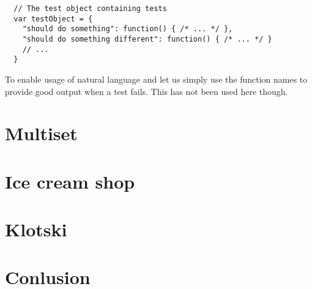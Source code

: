 \documentclass[a4paper,10pt]{article}
\begin{document}
\begin{verbatim}
  // The test object containing tests
  var testObject = {
    "should do something": function() { /* ... */ },
    "should do something different": function() { /* ... */ }
    // ...
  }
\end{verbatim}

To enable usage of natural language and let us simply use the function
names to provide good output when a test fails.  This has not been
used here though.

\section*{Multiset}

\section*{Ice cream shop}

\section*{Klotski}

\section*{Conlusion}
\end{document}
